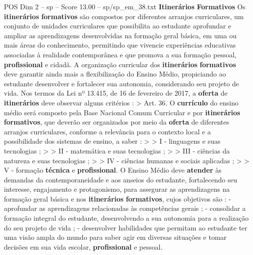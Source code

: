 \begin{textsample}{POS Dim 2 – sp – Score 13.00 – sp/sp\_em\_38.txt}  \label{ex:f2_pos_210}
\textbf{Itinerários} \textbf{Formativos} Os \textbf{itinerários} \textbf{formativos} são compostos por diferentes arranjos curriculares, um conjunto de unidades curriculares que possibilita ao estudante aprofundar e ampliar as aprendizagens desenvolvidas na formação geral básica, em uma ou mais áreas do conhecimento, permitindo que vivencie experiências educativas associadas à realidade contemporânea e que promova a sua formação pessoal, \textbf{profissional} e cidadã.
A organização curricular dos \textbf{itinerários} \textbf{formativos} deve garantir ainda mais a flexibilização do Ensino Médio, propiciando ao estudante desenvolver e fortalecer sua autonomia, considerando seu projeto de vida.
Nos termos da Lei nº 13.415, de 16 de fevereiro de 2017, a \textbf{oferta} de \textbf{itinerários} deve observar alguns critérios : > Art. 36.
O \textbf{currículo} do ensino médio será composto pela Base Nacional Comum Curricular e por \textbf{itinerários} \textbf{formativos}, que deverão ser organizados por meio da \textbf{oferta} de diferentes arranjos curriculares, conforme a relevância para o contexto local e a possibilidade dos sistemas de ensino, a saber : > > I - linguagens e suas tecnologias ; > > II - matemática e suas tecnologias ; > > III - ciências da natureza e suas tecnologias ; > > IV - ciências humanas e sociais aplicadas ; > > V - formação \textbf{técnica} e \textbf{profissional}.
O Ensino Médio deve \textbf{atender} às demandas da contemporaneidade e aos anseios do estudante, fortalecendo seu interesse, engajamento e protagonismo, para assegurar as aprendizagens na formação geral básica e nos \textbf{itinerários} \textbf{formativos}, cujos objetivos são : - aprofundar as aprendizagens relacionadas às competências gerais ; - consolidar a formação integral do estudante, desenvolvendo a sua autonomia para a realização do seu projeto de vida ; - desenvolver habilidades que permitam ao estudante ter uma visão ampla do mundo para saber agir em diversas situações e tomar decisões em sua vida escolar, \textbf{profissional} e pessoal.

\end{textsample}
